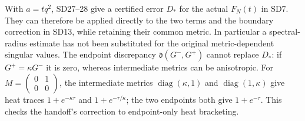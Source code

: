 \documentclass[11pt]{article}
\begin{document}
With $a=tq^2$, SD27--28 give a certified error $D_*$ for the actual
$F_N(t)$ in SD7. They can therefore be applied directly to the two
terms and the boundary correction in SD13, while retaining their
common metric. In particular a spectral-radius estimate has not been
substituted for the original metric-dependent singular values.
The endpoint discrepancy $\mathfrak d(G^-,G^+)$ cannot replace $D_*$:
if $G^+=\kappa G^-$ it is zero, whereas intermediate metrics can be
anisotropic. For $M=\left(\begin{smallmatrix}0&1\\0&0\end{smallmatrix}\right)$,
the intermediate metrics $\operatorname{diag}(\kappa,1)$ and
$\operatorname{diag}(1,\kappa)$ give heat traces $1+e^{-\kappa\tau}$
and $1+e^{-\tau/\kappa}$; the two endpoints both give $1+e^{-\tau}$.
This checks the handoff's correction to endpoint-only heat bracketing.
\end{document}
